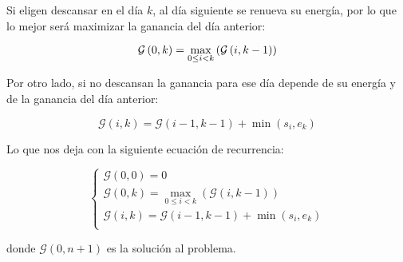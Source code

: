 Si eligen descansar en el d\'ia $k$, al d\'ia siguiente se renueva su
energ\'ia, por lo que lo mejor ser\'a maximizar la ganancia del d\'ia anterior:

\begin{equation}
\label{eq:g_{0k}}
    \mathcal{G} \left( 0, k \right) = \max_{0 \le i < k} \left( \mathcal{G} \left( i, k - 1 \right) \right)
\end{equation}

Por otro lado, si no descansan la ganancia para ese d\'ia depende de su
energ\'ia y de la ganancia del d\'ia anterior:

\begin{equation*}
    \mathcal{G} \left( i, k \right) = \mathcal{G} \left( i - 1, k - 1 \right) + \min \left( s_i, e_k \right)
\end{equation*}

Lo que nos deja con la siguiente ecuaci\'on de recurrencia:

\begin{equation}
    \begin{cases}
        \mathcal{G} \left( 0, 0 \right) = 0\\
        \mathcal{G} \left( 0, k \right) = \max_{0 \le i < k} \left( \mathcal{G} \left( i, k - 1 \right) \right)\\
        \mathcal{G} \left( i, k \right) = \mathcal{G} \left( i - 1, k - 1 \right) + \min \left( s_i, e_k \right)\\
    \end{cases}
\end{equation}

donde $\mathcal{G} \left( 0, n + 1 \right)$ es la soluci\'on al problema.
